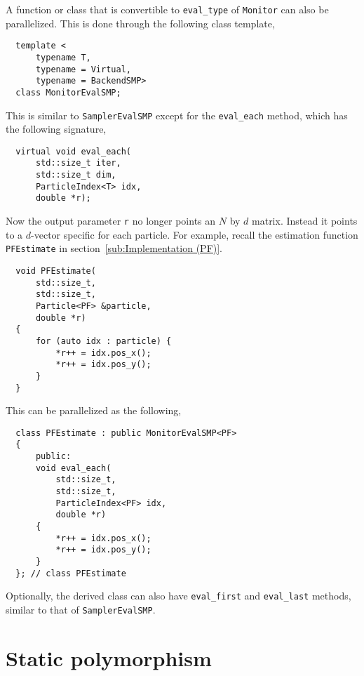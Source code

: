 A function or class that is convertible to \verb|eval_type| of \verb|Monitor|
can also be parallelized. This is done through the following class template,
\begin{Verbatim}
  template <
      typename T,
      typename = Virtual,
      typename = BackendSMP>
  class MonitorEvalSMP;
\end{Verbatim}
This is similar to \verb|SamplerEvalSMP| except for the \verb|eval_each|
method, which has the following signature,
\begin{Verbatim}
  virtual void eval_each(
      std::size_t iter,
      std::size_t dim,
      ParticleIndex<T> idx,
      double *r);
\end{Verbatim}
Now the output parameter \verb|r| no longer points an $N$ by $d$ matrix.
Instead it points to a $d$-vector specific for each particle. For example,
recall the estimation function \verb|PFEstimate| in
section~\ref{sub:Implementation (PF)}.
\begin{Verbatim}
  void PFEstimate(
      std::size_t,
      std::size_t,
      Particle<PF> &particle,
      double *r)
  {
      for (auto idx : particle) {
          *r++ = idx.pos_x();
          *r++ = idx.pos_y();
      }
  }
\end{Verbatim}
This can be parallelized as the following,
\begin{Verbatim}
  class PFEstimate : public MonitorEvalSMP<PF>
  {
      public:
      void eval_each(
          std::size_t,
          std::size_t,
          ParticleIndex<PF> idx,
          double *r)
      {
          *r++ = idx.pos_x();
          *r++ = idx.pos_y();
      }
  }; // class PFEstimate
\end{Verbatim}
Optionally, the derived class can also have \verb|eval_first| and
\verb|eval_last| methods, similar to that of \verb|SamplerEvalSMP|.

\section{Static polymorphism}
\label{sec:Static polymorphism}


